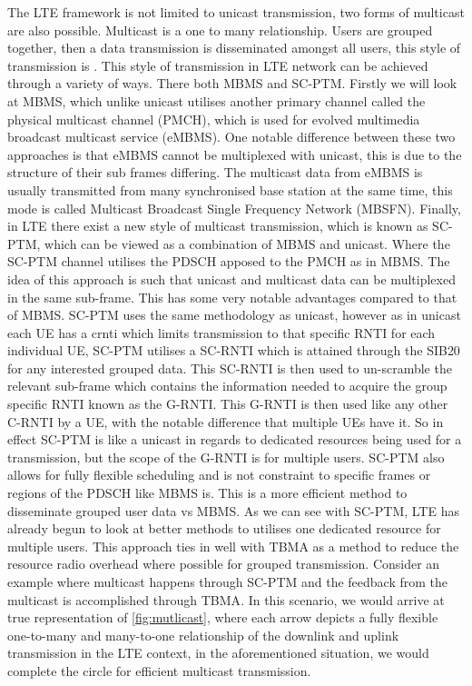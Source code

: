 \documentclass{article}
\begin{document}
The LTE framework is not limited to unicast transmission, two forms of multicast are also possible. Multicast is a one to many relationship. Users are grouped together, then a data transmission is disseminated amongst all users, this style of transmission is . This style of transmission in LTE network can be achieved through a variety of ways. There both \ac{MBMS} and \ac{SC-PTM}. Firstly we will look at MBMS, which unlike unicast utilises another primary channel called the physical multicast channel (PMCH), which is used for evolved multimedia broadcast multicast service (eMBMS). One notable difference between these two approaches is that eMBMS cannot be multiplexed with unicast, this is due to the structure of their sub frames differing. The multicast data from eMBMS is usually transmitted from many synchronised base station at the same time, this mode is called Multicast Broadcast Single Frequency Network (MBSFN). Finally, in LTE there exist a new style of multicast transmission, which is known as \ac{SC-PTM}, which can be viewed as a combination of \ac{MBMS} and unicast. Where the SC-PTM channel utilises the \ac{PDSCH} apposed to the PMCH as in MBMS. The idea of this approach is such that unicast and multicast data can be multiplexed in the same sub-frame. This has some very notable advantages compared to that of MBMS. SC-PTM uses the same methodology as unicast, however as in unicast each \ac{UE} has a \ac{crnti} which limits transmission to that specific RNTI for each individual UE, SC-PTM utilises a SC-RNTI which is attained through the \ac{SIB}20 for any interested grouped data. This SC-RNTI is then used to un-scramble the relevant sub-frame which contains the information needed to acquire the group specific RNTI known as the G-RNTI. This G-RNTI is then used like any other C-RNTI by a UE, with the notable difference that multiple UEs have it. So in effect SC-PTM is like a unicast in regards to dedicated resources being used for a transmission, but the scope of the G-RNTI is for multiple users. SC-PTM also allows for fully flexible scheduling and is not constraint to specific frames or regions of the PDSCH like MBMS is. This is a more efficient method to disseminate grouped user data vs \ac{MBMS}. As we can see with SC-PTM, LTE has already begun to look at better methods to utilises one dedicated resource for multiple users. This approach ties in well with \ac{TBMA} as a method to reduce the resource radio overhead where possible for grouped transmission. Consider an example where multicast happens through SC-PTM and the feedback from the multicast is accomplished through \ac{TBMA}. In this scenario, we would arrive at true representation of \cref{fig:mutlicast}, where each arrow depicts a fully flexible one-to-many and many-to-one relationship of the downlink and uplink transmission in the LTE context, in the aforementioned situation, we would complete the circle for efficient multicast transmission.  
\end{document}
